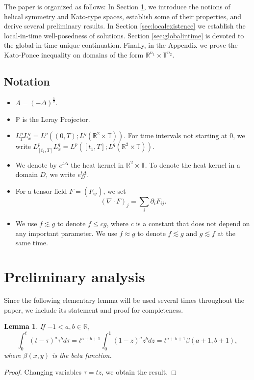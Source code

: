\documentclass[11pt,a4paper]{article}
\newcommand{\R}{\mathbb{R}}
\newcommand{\LP}{\mathbb{P}}
\newcommand{\T}{\mathbb{T}}
\newtheorem{lemma}[thm]{Lemma}
\begin{document}
The paper is organized as follows: 
In Section \ref{sec:prelimanalysis}, we introduce the notions of helical symmetry and Kato-type spaces, establish some of their properties, and derive several preliminary results.
In Section \ref{sec:localexistence} we establish the local-in-time well-posedness of solutions. Section \ref{sec:globalintime} is devoted to the global-in-time unique continuation. Finally, in the Appendix we prove the Kato-Ponce inequality on domains of the form $\R^{n_1}\times \T^{n_2}$.

\subsection{Notation}
\begin{itemize}
\item $\Lambda=(-\Delta)^\frac{1}{2}$.
\item $\LP$ is the Leray Projector.
\item $L^p_TL^q_x=L^p((0,T);L^q(\R^2\times \T)).$ For time intervals not starting at $0$, we write $L^p_{[t_1,T]}L^q_x=L^p([t_1,T];L^q(\R^2\times \T)).$
\item We denote by $e^{t\Delta}$ the heat kernel in $\R^2\times \T$. To denote the heat kernel in a domain $D$, we write $e^{t\Delta}_D$.
\item For a tensor field $F=(F_{ij})$, we set
$$
(\nabla\cdot F)_j=\sum_i\partial_iF_{ij}.
$$

\item We use $f\lesssim g$ to denote $f\leq cg$, where $c$ is a constant that does not depend on any important parameter. We use $f\approx g$ to denote $f\lesssim g$ and $g\lesssim f$ at the same time.
\end{itemize}

\section{Preliminary analysis}\label{sec:prelimanalysis}

Since the following elementary lemma will be used several times throughout the paper, we include its statement and proof for completeness.
\begin{lemma}\label{lemma:intbeta}
If $-1<a,b\in \R$,
$$\int_0^t (t-\tau)^a \tau^b d\tau=t^{a+b+1}\int_0^1 (1-z)^a z^b dz=t^{a+b+1}\beta(a+1,b+1),$$
where $\beta(x,y)$ is the beta function.
\end{lemma}
\begin{proof}
Changing variables $\tau=tz$, we obtain the result. \end{proof}
\end{document}
